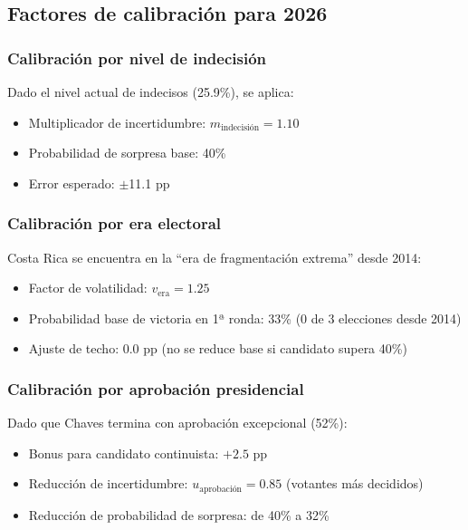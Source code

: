 \documentclass[11pt,a4paper]{article}
\begin{document}
\subsection{Factores de calibración para 2026}

\subsubsection{Calibración por nivel de indecisión}

Dado el nivel actual de indecisos (25.9\%), se aplica:
\begin{itemize}
    \item Multiplicador de incertidumbre: $m_{\text{indecisión}} = 1.10$
    \item Probabilidad de sorpresa base: 40\%
    \item Error esperado: $\pm$11.1 pp
\end{itemize}

\subsubsection{Calibración por era electoral}

Costa Rica se encuentra en la ``era de fragmentación extrema'' desde 2014:
\begin{itemize}
    \item Factor de volatilidad: $v_{\text{era}} = 1.25$
    \item Probabilidad base de victoria en 1ª ronda: 33\% (0 de 3 elecciones desde 2014)
    \item Ajuste de techo: 0.0 pp (no se reduce base si candidato supera 40\%)
\end{itemize}

\subsubsection{Calibración por aprobación presidencial}

Dado que Chaves termina con aprobación excepcional (52\%):
\begin{itemize}
    \item Bonus para candidato continuista: $+2.5$ pp
    \item Reducción de incertidumbre: $u_{\text{aprobación}} = 0.85$ (votantes más decididos)
    \item Reducción de probabilidad de sorpresa: de 40\% a 32\%
\end{itemize}
\end{document}

